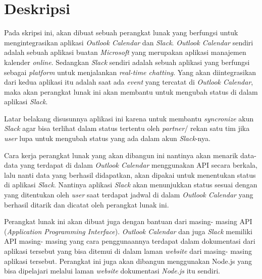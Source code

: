 \documentclass[a4paper,twoside]{article}
\begin{document}
\title{\@judultopik}
\author{\nama \textendash \@npm} 

\newcommand{\nama}{Sandy Giovanni S.}
\newcommand{\@npm}{2015730041}
\newcommand{\@judultopik}{Integrasi \textit{Outlook Calendar} dan \textit{Slack}} %
\newcommand{\jumpemb}{1} %
\newcommand{\tanggal}{29/01/2019}


\maketitle


\section{Deskripsi}
Pada skripsi ini, akan dibuat sebuah perangkat lunak yang berfungsi untuk mengintegrasikan aplikasi \textit{Outlook Calendar} dan \textit{Slack}.\textit{ Outlook Calendar} sendiri adalah sebuah aplikasi buatan \textit{Microsoft} yang merupakan aplikasi manajemen kalender \textit{online}. Sedangkan \textit{Slack} sendiri adalah sebuah aplikasi yang berfungsi sebagai \textit{platform} untuk menjalankan \textit{real-time chatting}. Yang akan diintegrasikan dari kedua aplikasi itu adalah saat ada \textit{event} yang tercatat di \textit{Outlook Calendar}, maka akan perangkat lunak ini akan membantu untuk mengubah status di dalam aplikasi \textit{Slack}. 

Latar belakang disusunnya aplikasi ini karena untuk membantu \textit{syncronize} akun \textit{Slack} agar bisa terlihat dalam status tertentu oleh \textit{partner}/ rekan satu tim jika \textit{user} lupa untuk mengubah status yang ada dalam akun \textit{Slack}-nya. 

Cara kerja perangkat lunak yang akan dibangun ini nantinya akan menarik data- data yang terdapat di dalam \textit{Outlook Calendar} menggunakan API secara berkala, lalu nanti data yang berhasil didapatkan, akan dipakai untuk menentukan status di aplikasi \textit{Slack}. Nantinya aplikasi \textit{Slack} akan menunjukkan status sesuai dengan yang ditentukan oleh \textit{user} saat terdapat jadwal di dalam \textit{Outlook Calendar} yang berhasil ditarik dan dicatat oleh perangkat lunak ini.  

Perangkat lunak ini akan dibuat juga dengan bantuan dari masing- masing API (\textit{Application Programming Interface}). \textit{Outlook Calendar} dan juga \textit{Slack} memiliki API masing- masing yang cara penggunaannya terdapat dalam dokumentasi dari aplikasi tersebut yang bisa ditemui di dalam laman \textit{website} dari masing- masing aplikasi tersebut. Perangkat ini juga akan dibangun menggunakan Node.js yang bisa dipelajari melalui laman \textit{website} dokumentasi \textit{Node.js} itu sendiri. 
\end{document}
